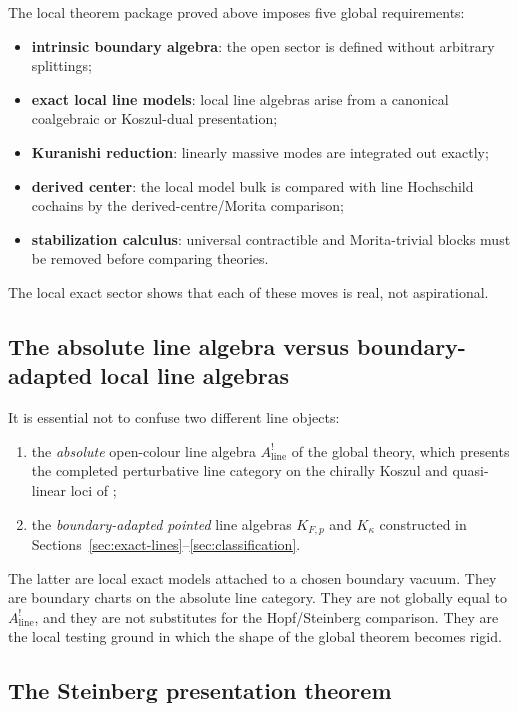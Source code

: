 The local theorem package proved above imposes five global requirements:
\begin{itemize}[leftmargin=1.8em]
\item \textbf{intrinsic boundary algebra}: the open sector is defined without arbitrary splittings;
\item \textbf{exact local line models}: local line algebras arise from a canonical coalgebraic or Koszul-dual presentation;
\item \textbf{Kuranishi reduction}: linearly massive modes are integrated out exactly;
\item \textbf{derived center}: the local model bulk is compared with
 line Hochschild cochains by the derived-centre/Morita comparison;
\item \textbf{stabilization calculus}: universal contractible and Morita-trivial blocks must be removed before comparing theories.
\end{itemize}
The local exact sector shows that each of these moves is real, not aspirational.

\subsection{The absolute line algebra versus boundary-adapted local line algebras}

It is essential not to confuse two different line objects:
\begin{enumerate}[label=(\roman*),leftmargin=1.8em]
\item the \emph{absolute} open-colour line algebra
$A^!_{\mathrm{line}}$ of the global theory, which presents the
completed perturbative line category on the chirally Koszul and
quasi-linear loci of \cite{DNP25};
\item the \emph{boundary-adapted pointed} line algebras $K_{F,p}$ and $K_\kappa$ constructed in Sections~\ref{sec:exact-lines}--\ref{sec:classification}.
\end{enumerate}
The latter are local exact models attached to a chosen boundary
vacuum. They are boundary charts on the absolute line
category. They are not globally equal to $A^!_{\mathrm{line}}$, and
they are not substitutes for the Hopf/Steinberg comparison. They are
the local testing ground in which the shape of the global theorem
becomes rigid.

\subsection{The Steinberg presentation theorem}

